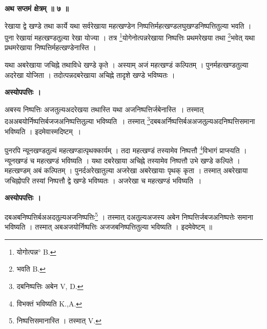 \documentclass[11pt, openany]{book}
\begin{document}
\begin{center}
\textbf{\large अथ सप्तमं क्षेत्रम् ॥ ७ ॥ }
\end{center}
\vspace{5mm}

{\ab रेखाया द्वे खण्डे तथा कार्ये यथा सर्वरेखाया महत्खण्डेन निष्पत्तिर्महत्खण्डलघुखण्डनिष्पत्तितुल्या भवति । पुना रेखायां महत्खण्डतुल्या रेखा योज्या । तत्र \renewcommand{\thefootnote}{५}\footnote{योगोत्पन्न° {\en B.}}योगेनोत्पन्नरेखाया निष्पत्तिः प्रथमरेखया तथा \renewcommand{\thefootnote}{६}\footnote{भवति {\en B.}}भवेत् यथा प्रथमरेखाया निष्पत्तिर्महत्खण्डेनास्ति । }

\newpage
 
 यथा अबरेखाया जचिह्ने तथाविधे खण्डे कृते । अस्याम् अजं महत्खण्डं कल्पितम् । पुनर्महत्खण्डतुल्या अदरेखा योजिता । तदोत्पन्नदबरेखाया अचिह्ने तादृशे खण्डे भविष्यतः । \\
 \begin{center}
\textbf{अस्योपपत्तिः । }
\end{center}
\vspace{3mm}

\begin{sloppypar}
अबस्य निष्पत्तिः अजतुल्यअदरेखया तथास्ति यथा अजनिष्पत्तिर्जबेनास्ति~। तस्मात् दअअबयोर्निष्पत्तिर्बजजअनिष्पत्तितुल्या भविष्यति~। तस्मात् \renewcommand{\thefootnote}{१}\footnote{दबनिष्पत्तिः अबेन {\en V, D.}}दबबअर्निष्पत्तिर्बअअजतुल्यअदनिष्पत्तिसमाना भविष्यति । इदमेवास्मदिष्टम्~। \\
\end{sloppypar}
\vspace{3mm}

पुनरपि न्यूनखण्डतुल्यं महत्खण्डात्पृथक्कार्यम् । तदा महत्खण्डं तस्यामेव निष्पत्तौ \renewcommand{\thefootnote}{२}\footnote{विभक्तं भविष्यति {\en K.,A.}}विभागं प्राप्स्यति । न्यूनखण्डं च महत्खण्डं भविष्यति । यथा दबरेखाया अचिह्ने तस्यामेव निष्पत्तौ उभे खण्डे कल्पिते । महत्खण्डम् अबं कल्पितम् । पुनर्दअरेखातुल्या अजरेखा अबरेखायाः पृथक् कृता । तस्मात् अबरेखाया जचिह्नोपरि तस्यां निष्पत्तौ द्वे खण्डे भविष्यतः । अजरेखा च महत्खण्डं भविष्यति~। \\
\vspace{3mm}

\begin{center}
\textbf{अस्योपपत्तिः । }
\end{center}
\vspace{3mm}

दबअबनिष्पत्तिर्बअअदतुल्यअजनिष्पत्तिः\renewcommand{\thefootnote}{३}\footnote{ निष्पत्तिसमानास्ति । तस्मात् {\en V.} } । तस्मात् दअतुल्यअजस्य अबेन निष्पत्तिर्जबजअनिष्पत्तेः समाना भविष्यति । तस्मात् अबअजयोर्निष्पत्तिः अजजबनिष्पत्तितुल्या भविष्यति । इदमेवेष्टम् ॥\\
\vspace{3mm}
\end{document}
